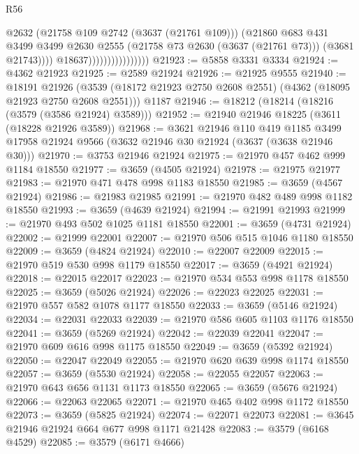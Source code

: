 \begin{lexlean}{R56}
\begin{coremodule}
                                        @2632
                                        (@21758 @109 @2742 (@3637 (@21761 @109)))
                                        (@21860
                                          @683
                                          @431
                                          @3499
                                          @3499
                                          @2630
                                          @2555
                                          (@21758 @73 @2630 (@3637 (@21761 @73)))
                                          (@3681 @21743))))
                                    @18637))))))))))))))))
@21923 := @5858 @3331 @3334
@21924 := @4362 @21923
@21925 := @2589 @21924
@21926 := @21925 @9555
@21940 := @18191
    @21926
    (@3539 (@18172 @21923 @2750 @2608 @2551) (@4362 (@18095 @21923 @2750 @2608 @2551)))
    @1187
@21946 := @18212 (@18214 (@18216 (@3579 (@3586 @21924) @3589)))
@21952 := @21940 @21946 @18225 (@3611 (@18228 @21926 @3589))
@21968 := @3621
    @21946
    @110
    @419
    @1185
    @3499
    @17958
    @21924
    @9566
    (@3632 @21946 @30 @21924 (@3637 (@3638 @21946 @30)))
@21970 := @3753 @21946 @21924
@21975 := @21970 @457 @462 @999 @1184 @18550
@21977 := @3659 (@4505 @21924)
@21978 := @21975 @21977
@21983 := @21970 @471 @478 @998 @1183 @18550
@21985 := @3659 (@4567 @21924)
@21986 := @21983 @21985
@21991 := @21970 @482 @489 @998 @1182 @18550
@21993 := @3659 (@4639 @21924)
@21994 := @21991 @21993
@21999 := @21970 @493 @502 @1025 @1181 @18550
@22001 := @3659 (@4731 @21924)
@22002 := @21999 @22001
@22007 := @21970 @506 @515 @1046 @1180 @18550
@22009 := @3659 (@4824 @21924)
@22010 := @22007 @22009
@22015 := @21970 @519 @530 @998 @1179 @18550
@22017 := @3659 (@4921 @21924)
@22018 := @22015 @22017
@22023 := @21970 @534 @553 @998 @1178 @18550
@22025 := @3659 (@5026 @21924)
@22026 := @22023 @22025
@22031 := @21970 @557 @582 @1078 @1177 @18550
@22033 := @3659 (@5146 @21924)
@22034 := @22031 @22033
@22039 := @21970 @586 @605 @1103 @1176 @18550
@22041 := @3659 (@5269 @21924)
@22042 := @22039 @22041
@22047 := @21970 @609 @616 @998 @1175 @18550
@22049 := @3659 (@5392 @21924)
@22050 := @22047 @22049
@22055 := @21970 @620 @639 @998 @1174 @18550
@22057 := @3659 (@5530 @21924)
@22058 := @22055 @22057
@22063 := @21970 @643 @656 @1131 @1173 @18550
@22065 := @3659 (@5676 @21924)
@22066 := @22063 @22065
@22071 := @21970 @465 @402 @998 @1172 @18550
@22073 := @3659 (@5825 @21924)
@22074 := @22071 @22073
@22081 := @3645 @21946 @21924 @664 @677 @998 @1171 @21428
@22083 := @3579 (@6168 @4529)
@22085 := @3579 (@6171 @4666)

\end{coremodule}
\end{lexlean}
